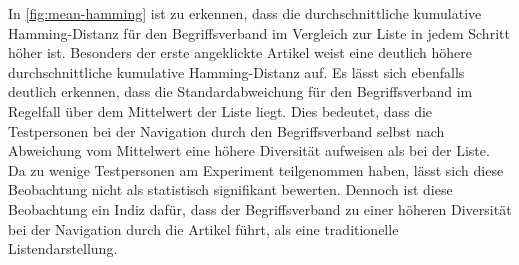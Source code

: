 In \autoref{fig:mean-hamming} ist zu erkennen, dass die durchschnittliche kumulative Hamming-Distanz für den Begriffsverband im Vergleich zur Liste in jedem Schritt höher ist.
Besonders der erste angeklickte Artikel weist eine deutlich höhere durchschnittliche kumulative Hamming-Distanz auf.
Es lässt sich ebenfalls deutlich erkennen, dass die Standardabweichung für den Begriffsverband im Regelfall über dem Mittelwert der Liste liegt.
Dies bedeutet, dass die Testpersonen bei der Navigation durch den Begriffsverband selbst nach Abweichung vom Mittelwert eine höhere Diversität aufweisen als bei der Liste.
Da zu wenige Testpersonen am Experiment teilgenommen haben, lässt sich diese Beobachtung nicht als statistisch signifikant bewerten.
Dennoch ist diese Beobachtung ein Indiz dafür, dass der Begriffsverband zu einer höheren Diversität bei der Navigation durch die Artikel führt, als eine traditionelle Listendarstellung.
